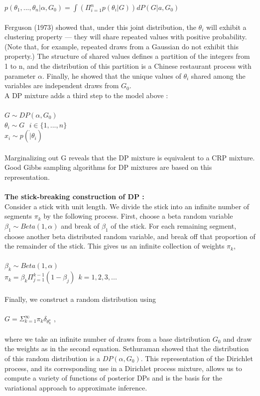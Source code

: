 \documentclass[12pt, a4paper]{paper}
\begin{document}
$p(\theta_{1},...,\theta_{n}|\alpha,G_{0}) = \int \left( \Pi^{n}_{i=1} p(\theta_{i}|G) \right) dP(G|a,G_{0})$ \\\\
Ferguson (1973) \citep{ferguson1973} showed that, under this joint distribution, the $\theta_{i}$ will exhibit a
clustering property — they will share repeated values with positive probability. (Note that, for example, repeated draws from a Gaussian do not exhibit this property.) The structure of shared values defines a partition of the integers from 1 to n, and the distribution of this partition is a Chinese restaurant process with parameter $\alpha$. Finally, he showed that the unique values of $\theta_{i}$ shared among the variables are independent draws from $G_{0}$. \\ 
A DP mixture adds a third step to the model above \citep{Antoniak1974MixturesOD}: \\\\
$G \sim DP(\alpha, G_{0})$ \\
$\theta_{i} \sim G \ \ \ i \in \{1,...,n\}$ \\
$x_{i} \sim p(\dot|\theta_{i})$ \\\\
Marginalizing out G reveals that the DP mixture is equivalent to a CRP mixture. Good Gibbs sampling algorithms for DP mixtures are based on this representation. \\\\
\textbf{The stick-breaking construction of DP \citep{sethuraman1994constructive}:} \\
Consider a stick with unit length. We divide the stick into an infinite number of segments $\pi_{k}$ by the following process. First, choose a beta random variable $\beta_{1} \sim Beta(1,\alpha)$ and break of $\beta_{1}$ of the stick. For each remaining segment, choose another beta distributed random variable, and break off that proportion of the remainder of the stick. This gives us an infinite collection of weights $\pi_{k}$, \\\\
$\beta_{k} \sim Beta(1,\alpha)$ \\
$\pi_{k} = \beta_{k} \Pi_{j=1}^{k-1} (1-\beta_{j}) \ \ k = 1,2,3,...$ \\\\
Finally, we construct a random distribution using \\\\
$G = \Sigma^{\infty}_{k=1} \pi_{k}\delta_{\theta_{k}^{\star}}$ ,\\\\ where we take an infinite number of draws from a base distribution $G_{0}$ and draw the weights as in the second equation. Sethuraman \citep{sethuraman1994constructive} showed that the distribution of this random distribution is a $DP(\alpha, G_{0})$.
This representation of the Dirichlet process, and its corresponding use in a Dirichlet process mixture, allows us to compute a variety of functions of posterior DPs \citep{gelfand2002computational} and is the basis for the variational approach to approximate inference. 
\end{document}
